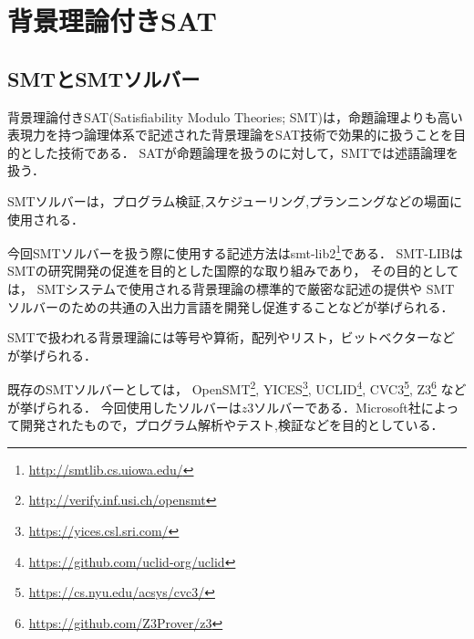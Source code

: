 \chapter{背景理論付きSAT}\label{chap:smt}

%
%
\section{SMTとSMTソルバー}
背景理論付きSAT(Satisfiability Modulo Theories; SMT)は，命題論理よりも高い表現力を持つ論理体系で記述された背景理論をSAT技術で効果的に扱うことを目的とした技術である．
SATが命題論理を扱うのに対して，SMTでは述語論理を扱う\cite{JSAI:IwanumaN10}．

%
%
SMTソルバーは，プログラム検証,スケジューリング,プランニングなどの場面に使用される．


今回SMTソルバーを扱う際に使用する記述方法はsmt-lib2\footnote{\url{http://smtlib.cs.uiowa.edu/}}である．
SMT-LIBはSMTの研究開発の促進を目的とした国際的な取り組みであり，
その目的としては，
SMTシステムで使用される背景理論の標準的で厳密な記述の提供や
SMTソルバーのための共通の入出力言語を開発し促進することなどが挙げられる．




SMTで扱われる背景理論には等号や算術，配列やリスト，ビットベクターなどが挙げられる．

既存のSMTソルバーとしては，
OpenSMT\footnote{\url{http://verify.inf.usi.ch/opensmt}},
YICES\footnote{\url{https://yices.csl.sri.com/}},
UCLID\footnote{\url{https://github.com/uclid-org/uclid}},
CVC3\footnote{\url{https://cs.nyu.edu/acsys/cvc3/}},
Z3\footnote{\url{https://github.com/Z3Prover/z3}}
などが挙げられる．
今回使用したソルバーは$z3ソルバー$である．Microsoft社によって開発されたもので，プログラム解析やテスト,検証などを目的としている\cite{Umemura10:jssst}．


